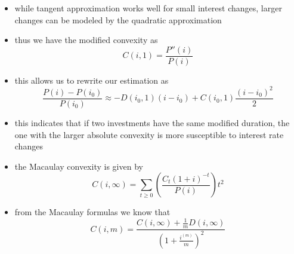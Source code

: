 \documentclass[../00_main.tex]{subfiles}
\begin{document}
\begin{itemize}
    \item while tangent approximation works well for small interest changes,
        larger changes can be modeled by the quadratic approximation
    \item thus we have the modified convexity as
        \begin{equation}\nonumber
            C(i, 1) = \frac{P''(i)}{P(i)}
        \end{equation}
    \item this allows us to rewrite our estimation as
        \begin{equation}\nonumber
            \frac{P(i) - P(i_0)}{P(i_0)} \approx -D(i_0,1)(i - i_0) + C(i_0,
            1)\frac{(i-i_0)^2}{2}
        \end{equation}
    \item this indicates that if two investments have the same modified
        duration, the one with the larger absolute convexity is more
        susceptible to interest rate changes
    \item the Macaulay convexity is given by
        \begin{equation}\nonumber
            C(i, \infty) = \sum_{t \ge 0} \left( \frac{C_t (1+i)^{-t}}
                {P(i)}\right)t^2
        \end{equation}
    \item from the Macaulay formulas we know that
        \begin{equation}\nonumber
            C(i, m) = \frac{C(i, \infty) + \frac{1}{m}D(i, \infty)}{\left(
            1 + \frac{i^{(m)}}{m}\right)^2}
        \end{equation}
\end{itemize}
\end{document}
